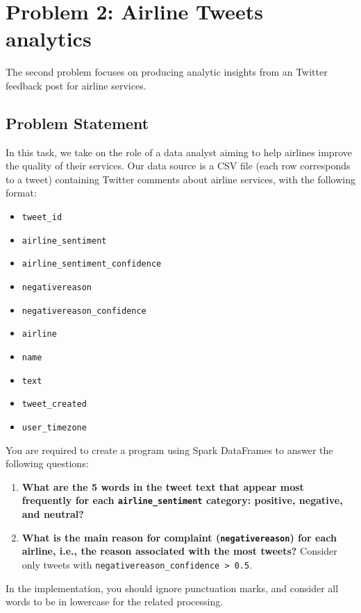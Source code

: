 \documentclass[acmlarge]{acmart}
\begin{document}
  \newpage
  \section{Problem 2: Airline Tweets analytics}
  \label{sec:problem2}
  The second problem focuses on producing analytic insights from an Twitter feedback post for airline services.


  \subsection{Problem Statement}
  In this task, we take on the role of a data analyst aiming to help airlines improve the quality of their services. Our data source is a CSV file (each row corresponds to a tweet) containing Twitter comments about airline services, with the following format:

  \begin{itemize}
    \item \texttt{tweet\_id}
    \item \texttt{airline\_sentiment}
    \item \texttt{airline\_sentiment\_confidence}
    \item \texttt{negativereason}
    \item \texttt{negativereason\_confidence}
    \item \texttt{airline}
    \item \texttt{name}
    \item \texttt{text}
    \item \texttt{tweet\_created}
    \item \texttt{user\_timezone}
  \end{itemize}

  You are required to create a program using Spark DataFrames to answer the following questions:

  \begin{enumerate}
    \item \textbf{What are the 5 words in the tweet text that appear most frequently for each \texttt{airline\_sentiment} category: positive, negative, and neutral?}
    \item \textbf{What is the main reason for complaint (\texttt{negativereason}) for each airline, i.e., the reason associated with the most tweets?} Consider only tweets with \texttt{negativereason\_confidence > 0.5}.
  \end{enumerate}

  In the implementation, you should ignore punctuation marks, and consider all words to be in lowercase for the related processing.
\end{document}

